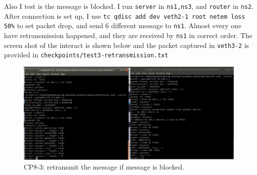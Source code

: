 \documentclass[11pt]{article}
\begin{document}
	\par Also I test is the message is blocked. I run \texttt{server} in \texttt{ns1,ns3}, and \texttt{router} in \texttt{ns2}. After connection is set up, I use \texttt{tc qdisc add dev veth2-1 root netem loss 50\%} to set packet drop, and send $6$ different message to \texttt{ns1}. Almost every one have retransmission happened, and they are received by \texttt{ns1} in correct order. The screen shot of the interact is shown below and the packet captured in \texttt{veth3-2} is provided in \texttt{checkpoints/test3-retransmission.txt}
	
	\begin{figure}[htbp]
		\centering
		\includegraphics[width=0.9\linewidth]{../lab-netstack-premium-master/checkpoints/test3-retransmission.png}
		\caption{CP8-3: retransmit the message if message is blocked.}
		\label{fig:CP8-3}
	\end{figure}
	
	
	
	
		
\end{document}
